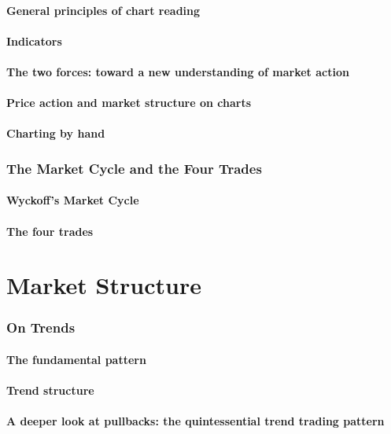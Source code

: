\documentclass[10pt,twocolumn]{article}
\begin{document}
\subsection{General principles of chart reading}
\subsection{Indicators}
\subsection{The two forces: toward a new understanding of market action}
\subsection{Price action and market structure on charts}
\subsection{Charting by hand}

\section{The Market Cycle and the Four Trades}
\subsection{Wyckoff's Market Cycle}
\subsection{The four trades}

\part{Market Structure}
\section{On Trends}
\subsection{The fundamental pattern}
\subsection{Trend structure}
\subsection{A deeper look at pullbacks: the quintessential trend trading pattern}
\end{document}
